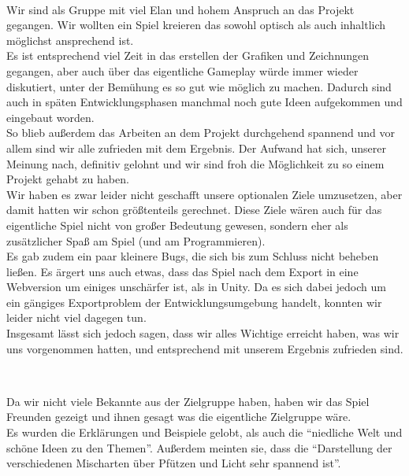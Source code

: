 \documentclass[10pt,a4paper,notitlepage]{report}
\begin{document}
	\\\par\medskip\Text
	Wir sind als Gruppe mit viel Elan und hohem Anspruch an das Projekt gegangen. Wir wollten ein Spiel kreieren das sowohl optisch als auch inhaltlich möglichst ansprechend ist.\\
	Es ist entsprechend viel Zeit in das erstellen der Grafiken und Zeichnungen gegangen, aber auch über das eigentliche Gameplay würde immer wieder diskutiert, unter der Bemühung es so gut wie möglich zu machen. Dadurch sind auch in späten Entwicklungsphasen manchmal noch gute Ideen aufgekommen und eingebaut worden.\\
	So blieb außerdem das Arbeiten an dem Projekt durchgehend spannend und vor allem sind wir alle zufrieden mit dem Ergebnis. Der Aufwand hat sich, unserer Meinung nach, definitiv gelohnt und wir sind froh die Möglichkeit zu so einem Projekt gehabt zu haben.\\
	Wir haben es zwar leider nicht geschafft unsere optionalen Ziele umzusetzen, aber damit hatten wir schon größtenteils gerechnet. Diese Ziele wären auch für das eigentliche Spiel nicht von großer Bedeutung gewesen, sondern eher als zusätzlicher Spaß am Spiel (und am Programmieren).\\
	Es gab zudem ein paar kleinere Bugs, die sich bis zum Schluss nicht beheben ließen. Es ärgert uns auch etwas, dass das Spiel nach dem Export in eine Webversion um einiges unschärfer ist, als in Unity. Da es sich dabei jedoch um ein gängiges Exportproblem der Entwicklungsumgebung handelt, konnten wir leider nicht viel dagegen tun.\\
	Insgesamt lässt sich jedoch sagen, dass wir alles Wichtige erreicht haben, was wir uns vorgenommen hatten, und entsprechend mit unserem Ergebnis zufrieden sind.\\\par\smallskip
	
	\\\par\medskip\Text
	
	Da wir nicht viele Bekannte aus der Zielgruppe haben, haben wir das Spiel Freunden gezeigt und ihnen gesagt was die eigentliche Zielgruppe wäre.\\
	
	Es wurden die Erklärungen und Beispiele gelobt, als auch die \enquote{niedliche Welt und schöne Ideen zu den Themen}. Außerdem meinten sie, dass die \enquote{Darstellung der verschiedenen Mischarten über Pfützen und Licht sehr spannend ist}.\\
\end{document}
